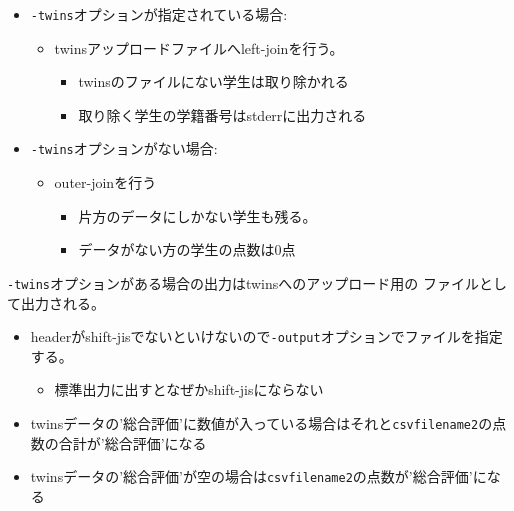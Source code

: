 \begin{itemize}
\item \texttt{-twins}オプションが指定されている場合:

\begin{itemize}
\item twinsアップロードファイルへleft-joinを行う。

\begin{itemize}
\item twinsのファイルにない学生は取り除かれる

\item 取り除く学生の学籍番号はstderrに出力される

\end{itemize}

\end{itemize}

\item \texttt{-twins}オプションがない場合:

\begin{itemize}
\item outer-joinを行う

\begin{itemize}
\item 片方のデータにしかない学生も残る。

\item データがない方の学生の点数は0点

\end{itemize}

\end{itemize}

\end{itemize}

\texttt{-twins}オプションがある場合の出力はtwinsへのアップロード用の
ファイルとして出力される。

\begin{itemize}
\item headerがshift-jisでないといけないので\texttt{-output}オプションでファイルを指定する。

\begin{itemize}
\item 標準出力に出すとなぜかshift-jisにならない\frownie 

\end{itemize}

\item twinsデータの'総合評価'に数値が入っている場合はそれと\texttt{csvfilename2}の点数の合計が'総合評価'になる

\item twinsデータの'総合評価'が空の場合は\texttt{csvfilename2}の点数が'総合評価'になる

\end{itemize}

